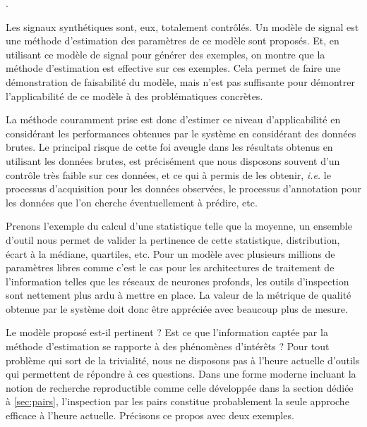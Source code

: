   .

  Les signaux synthétiques sont, eux, totalement contrôlés. Un modèle de signal est une méthode d'estimation des paramètres de ce modèle sont proposés. Et, en utilisant ce modèle de signal pour générer des exemples, on montre que la méthode d'estimation est effective sur ces exemples. Cela permet de faire une démonstration de faisabilité du modèle, mais n'est pas suffisante pour démontrer l'applicabilité de ce modèle à des problématiques concrètes.

  La méthode couramment prise est donc d'estimer ce niveau d'applicabilité en considérant les performances obtenues par le système en considérant des données brutes. Le principal risque de cette foi aveugle dans les résultats obtenus en utilisant les données brutes, est précisément que nous disposons souvent d'un contrôle très faible sur ces données, et ce qui à permis de les obtenir, \textit{i.e.} le processus d'acquisition pour les données observées, le processus d'annotation pour les données que l'on cherche éventuellement à prédire, etc.

  Prenons l'exemple du calcul d'une statistique telle que la moyenne, un ensemble d'outil nous permet de valider la pertinence de cette statistique, distribution, écart à la médiane, quartiles, etc. Pour un modèle avec plusieurs millions de paramètres libres comme c'est le cas pour les architectures de traitement de l'information telles que les réseaux de neurones profonds, les outils d'inspection sont nettement plus ardu à mettre en place. La valeur de la métrique de qualité obtenue par le système doit donc être appréciée avec beaucoup plus de mesure.

  Le modèle proposé est-il pertinent ? Est ce que l'information captée par la méthode d'estimation se rapporte à des phénomènes d'intérêts ? Pour tout problème qui sort de la trivialité, nous ne disposons pas à l'heure actuelle d'outils qui permettent de répondre à ces questions. Dans une forme moderne incluant la notion de recherche reproductible comme celle développée dans la section dédiée à \ref{sec:pairs}, l'inspection par les pairs constitue probablement la seule approche efficace à l'heure actuelle. Précisons ce propos avec deux exemples.

